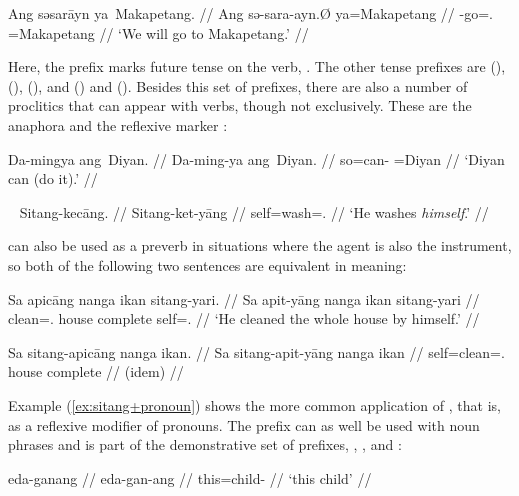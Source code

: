 \ex\begingl
	\gla Ang səsarāyn ya~Makapetang. //
	\glb Ang sə-sara-ayn.Ø ya=Makapetang //
	\glc \AgtT{} \Fut{}-go=\Fpl{}.\Top{} \Loc{}=Makapetang //
	\glft `We will go to Makapetang.' //
\endgl\xe

Here, the prefix  marks future tense on the verb, 
. The other tense prefixes are  
(\NPst{}),  (\Pst{}),  (\RPst{}), and  
(\NFut{}) and  (\RFut{}). Besides this set of prefixes, there are 
also a number of proclitics that can appear with verbs, though not exclusively. 
These are the anaphora  and the 
reflexive marker :

\ex\begingl
	\gla Da-mingya ang~Diyan. //
	\glb Da-ming-ya ang~Diyan. //
	\glc so=can-\TsgM{} \Aarg{}=Diyan //
	\glft `Diyan can (do it).' //
\endgl
% 
\xe

\ex~\begingl
	\gla Sitang-kecāng. //
	\glb Sitang-ket-yāng //
	\glc self=wash=\TsgM{}.\Aarg{} //
	\glft `He washes \emph{himself}.' //
\endgl\xe

 can also be used as a preverb in situations where the 
agent is also the instrument, so both of the following two sentences are 
equivalent in meaning:

\pex
\a\label{ex:sitang+pronoun}\begingl
	\gla Sa apicāng nanga ikan sitang-yari. //
	\glb Sa apit-yāng nanga ikan sitang-yari //
	\glc \PatT{} clean=\Tsg{}.\Aarg{} house complete self=\TsgM{}.\Ins{} //
	\glft `He cleaned the whole house by himself.' //
\endgl

\a\begingl
	\gla Sa sitang-apicāng nanga ikan. //
	\glb Sa sitang-apit-yāng nanga ikan //
	\glc \PatT{} self=clean=\Tsg{}.\Aarg{} house complete //
	\glft (idem) //
\endgl
\xe

Example (\ref{ex:sitang+pronoun}) shows the more common application of 
, that is, as a reflexive modifier of pronouns. The 
prefix  can as well be used with noun phrases and is part of the 
demonstrative set of prefixes, , , and 
:

\ex\begingl
	\gla eda-ganang //
	\glb eda-gan-ang //
	\glc this=child-\Aarg{} //
	\glft `this child' //
\endgl\xe

